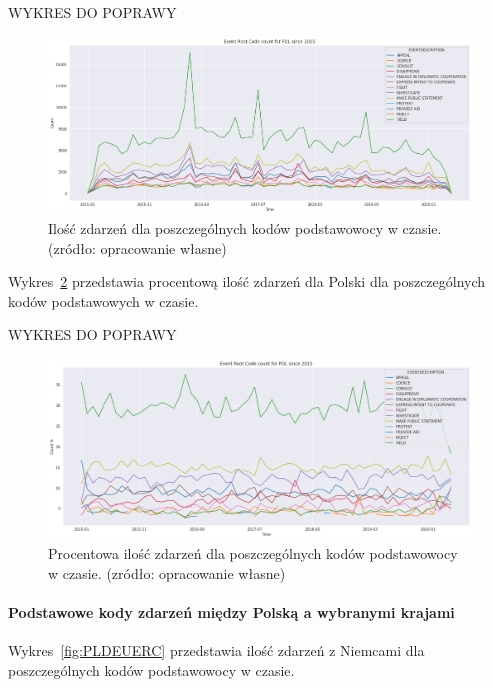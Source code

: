\documentclass[11pt]{report}
\begin{document}
    WYKRES DO POPRAWY
    \begin{figure}[ht]
        \centering
        \includegraphics[width=1 \textwidth]{fig/PL/PLERCinTIME.png}
        \caption{Ilość zdarzeń dla poszczególnych kodów podstawowocy w czasie. (zródło: opracowanie własne)}
        \label{fig:PLPERCinTIME}
    \end{figure}

    Wykres~\ref{fig:PLPERCpercinTIME} przedstawia procentową ilość zdarzeń dla Polski dla poszczególnych kodów podstawowych w czasie.

    WYKRES DO POPRAWY
    \begin{figure}[ht]
        \centering
        \includegraphics[width=1 \textwidth]{fig/PL/PLERCpercinTIME.png}
        \caption{Procentowa ilość zdarzeń dla poszczególnych kodów podstawowocy w czasie. (zródło: opracowanie własne)}
        \label{fig:PLPERCpercinTIME}
    \end{figure}

    \paragraph{Podstawowe kody zdarzeń między Polską a wybranymi krajami}

    Wykres~\ref{fig:PLDEUERC} przedstawia ilość zdarzeń z Niemcami dla poszczególnych kodów podstawowocy w czasie.
\end{document}
